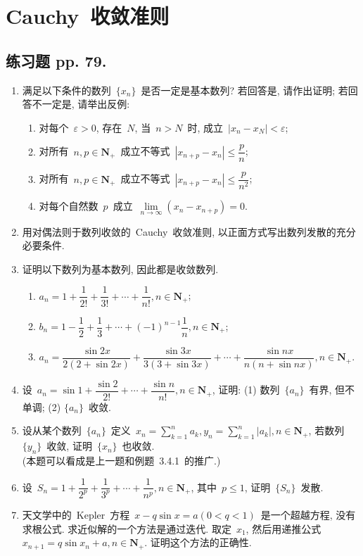 \documentclass[UTF8,a4paper,11pt,twoside]{book}
\begin{document}
\section{Cauchy~收敛准则}
\subsection{练习题 pp. 79.}
\begin{enumerate}
	\item 满足以下条件的数列~$\{x_n\}$~是否一定是基本数列? 若回答是, 请作出证明; 若回答不一定是, 请举出反例:
	      \begin{enumerate}[(1)]
		      \item 对每个~$\varepsilon>0$, 存在~$N$, 当~$n>N$~时, 成立~$|x_n-x_N|<\varepsilon$;
		      \item 对所有~$n,p\in\mathbf{N}_{+}$~成立不等式~$|x_{n+p}-x_n|\leqslant\dfrac{p}{n}$;
		      \item 对所有~$n,p\in\mathbf{N}_{+}$~成立不等式~$|x_{n+p}-x_n|\leqslant\dfrac{p}{n^2}$;
		      \item 对每个自然数~$p$~成立~$\lim\limits_{n\to\infty} (x_n-x_{n+p})=0$.
	      \end{enumerate}

	\item 用对偶法则于数列收敛的~Cauchy~收敛准则, 以正面方式写出数列发散的充分必要条件.

	\item 证明以下数列为基本数列, 因此都是收敛数列.
	      \begin{enumerate}[(1)]
		      \item $a_n=1+\dfrac{1}{2!}+\dfrac{1}{3!}+\cdots+\dfrac{1}{n!}, n\in\mathbf{N}_{+}$;
		      \item $b_n=1-\dfrac{1}{2}+\dfrac{1}{3}+\cdots+(-1)^{n-1}\dfrac{1}{n}, n\in\mathbf{N}_{+}$;
		      \item $a_n=\dfrac{\sin{2x}}{2(2+\sin{2x})}+\dfrac{\sin{3x}}{3(3+\sin{3x})}+\cdots+\dfrac{\sin{nx}}{n(n+\sin{nx})}, n\in\mathbf{N}_{+}$.
	      \end{enumerate}

	\item 设~$a_n=\sin{1}+\dfrac{\sin{2}}{2!}+\cdots+\dfrac{\sin{n}}{n!}, n\in\mathbf{N}_{+}$, 证明: (1) 数列~$\{a_n\}$~有界, 但不单调; (2) $\{a_n\}$~收敛.

	\item 设从某个数列~$\{a_n\}$~定义~$x_n=\sum\limits_{k=1}^n a_k, y_n=\sum\limits_{k=1}^n |a_k|, n\in\mathbf{N}_{+}$, 若数列~$\{y_n\}$~收敛, 证明~$\{x_n\}$~也收敛.\\
	      (本题可以看成是上一题和例题~3.4.1~的推广.)

	\item 设~$S_n=1+\dfrac{1}{2^p}+\dfrac{1}{3^p}+\cdots+\dfrac{1}{n^p}, n\in\mathbf{N}_{+}$, 其中~$p\leqslant 1$, 证明~$\{S_n\}$~发散.

	\item 天文学中的~Kepler~方程~$x-q\sin{x}=a (0<q<1)$~是一个超越方程, 没有求根公式. 求近似解的一个方法是通过迭代. 取定~$x_1$, 然后用递推公式~$x_{n+1}=q\sin{x_n}+a, n\in\mathbf{N}_{+}$. 证明这个方法的正确性.
\end{enumerate}
\end{document}
